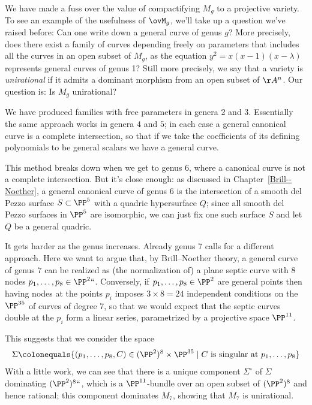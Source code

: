 We have made a fuss over the value of compactifying $M_g$ to a projective variety. To see an example of the usefulness of $\ovM_g$, we'll take up a question we've raised before: Can one write down a general curve of genus $g$?
More precisely,  does there exist a family of curves depending freely
on parameters that includes all the curves in an open subset of
$M_{g}$,
as the equation $y^{2} = x(x-1)(x-\lambda)$
represents general curves of genus 1? Still more precisely,
we say that a variety is \emph{unirational}
%
if it admits a
dominant morphism
%
from an open subset of $\AA^{n}$.
Our question is: Is $M_g$ unirational?

We have produced  families with free parameters in genera 2 and 3. Essentially
the same approach works in genera $4$ and $5$; in each case a general
canonical curve is a
complete intersection,
%
so that if we take the coefficients of its defining polynomials to be
general scalars we have a general curve.

This method breaks down when we get to genus 6, where a canonical curve is not a complete intersection. But it's close enough: as discussed in Chapter~\ref{Brill--Noether}, a general canonical curve of genus 6 is the intersection of a smooth del Pezzo surface $S \subset \PP^5$ with a quadric hypersurface $Q$; since all smooth del Pezzo surfaces in $\PP^5$ are isomorphic, we can just fix one such surface $S$ and let $Q$ be a general quadric.

It gets harder as the genus increases. Already genus 7 calls for a
different approach. Here we want to argue that, by
Brill--Noether theory,
%
a general curve of genus $7$ can be realized as (the normalization of)
a plane
septic curve
%
with 8 nodes $p_1,\dots,p_8 \in \PP^2` `$. Conversely, if $p_1,\dots,p_8 \in \PP^2$ are general points then having nodes at the points $p_i$ imposes $ 3\times 8 = 24$ independent conditions on the $\PP^{35}$ of curves of degree 7, so that we would expect that the septic curves double at the $p_i$ form a linear series, parametrized by a projective space $\PP^{11}$.

This suggests that we consider the space
$$
\Sigma \colonequals  \{ (p_1,\dots,p_8,C) \in (\PP^2)^8 \times \PP^{35} \mid C \text{ is singular at } p_1,\dots,p_8 \}
$$
With a little work, we can see that there is a unique component $\Sigma^\circ$ of $\Sigma$ dominating $(\PP^2)^8` `$, which is a $\PP^{11}$-bundle over an open subset of $(\PP^2)^8$ and hence rational; this component dominates $M_7$, showing that $M_7$ is unirational.

